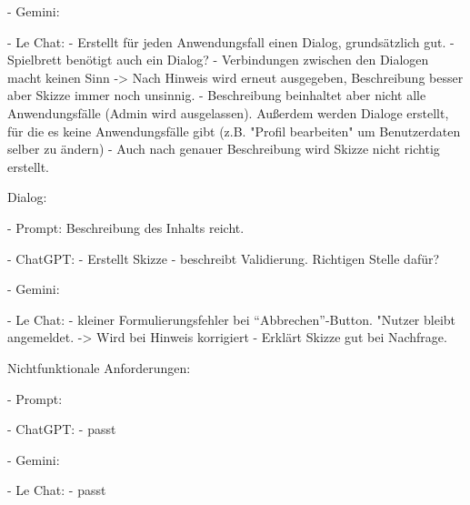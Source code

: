 - Gemini:

- Le Chat:
    - Erstellt für jeden Anwendungsfall einen Dialog, grundsätzlich gut.
    - Spielbrett benötigt auch ein Dialog?
    - Verbindungen zwischen den Dialogen macht keinen Sinn -> Nach Hinweis wird erneut ausgegeben, Beschreibung besser
    aber Skizze immer noch unsinnig.
    - Beschreibung beinhaltet aber nicht alle Anwendungsfälle (Admin wird ausgelassen). Außerdem werden Dialoge erstellt,
    für die es keine Anwendungsfälle gibt (z.B. "Profil bearbeiten" um Benutzerdaten selber zu ändern)
    - Auch nach genauer Beschreibung wird Skizze nicht richtig erstellt.
    


Dialog:

- Prompt: Beschreibung des Inhalts reicht.

- ChatGPT:
    - Erstellt Skizze
    - beschreibt Validierung. Richtigen Stelle dafür?

- Gemini:

- Le Chat: 
    - kleiner Formulierungsfehler bei ``Abbrechen''-Button. "Nutzer bleibt angemeldet. -> Wird bei Hinweis korrigiert
    - Erklärt Skizze gut bei Nachfrage.


Nichtfunktionale Anforderungen:

- Prompt: 

- ChatGPT:
    - passt

- Gemini:

- Le Chat: 
    - passt